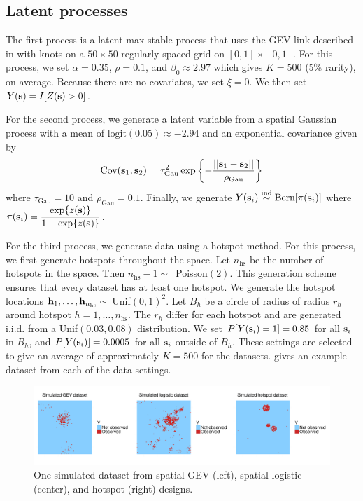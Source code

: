 \subsection{Latent processes} \label{rbs:simsettings}
The first process is a latent max-stable process that uses the GEV link described in  with knots on a $50 \times 50$ regularly spaced grid on $[0, 1] \times [0, 1]$.
For this process, we set $\alpha = 0.35$, $\rho = 0.1$, and $\beta_0 \approx 2.97$ which gives $K = 500$ (5\% rarity), on average.
Because there are no covariates, we set $\xi = 0$.
We then set $Y(\mathbf{s}) = I[Z(\mathbf{s}) > 0]$.

For the second process, we generate a latent variable from a spatial Gaussian process with a mean of $\text{logit}(0.05) \approx -2.94$ and an exponential covariance given by
\begin{align}
  \text{Cov}(\mathbf{s}_1, \mathbf{s}_2) = \tau_\text{Gau}^2 \exp\left\{- \frac{||\mathbf{s}_1 - \mathbf{s}_2||}{\rho_\text{Gau}}\right\}
\end{align}
where $\tau_\text{Gau} = 10$ and $\rho_\text{Gau} = 0.1$.
Finally, we generate $Y(\mathbf{s}_i) \stackrel{\mathrm{ind}}{\sim} \text{Bern}[\pi(\mathbf{s}_i)]$
where $\pi(\mathbf{s}_i) = \displaystyle \frac{ \exp\{z(\mathbf{s})\}}{1 + \exp\{z(\mathbf{s})\} }$.

For the third process, we generate data using a hotspot method.
For this process, we first generate hotspots throughout the space.
Let $n_\text{hs}$ be the number of hotspots in the space.
Then \mbox{$n_\text{hs} - 1 \sim$ Poisson$(2)$}.
This generation scheme ensures that every dataset has at least one hotspot.
We generate the hotspot locations $\mathbf{h}_1, \ldots, \mathbf{h}_{n_\text{hs}} \sim$ Unif$(0, 1)^2$.
Let $B_h$ be a circle of radius of radius $r_h$ around hotspot $h = 1, \ldots, n_\text{hs}$.
The $r_h$ differ for each hotspot and are generated i.i.d. from a Unif$(0.03, 0.08)$ distribution.
We set $P[Y(\mathbf{s}_i) = 1] = 0.85$ for all $\mathbf{s}_i$ in $B_h$, and $P[Y(\mathbf{s}_i)] = 0.0005$ for all $\mathbf{s}_i$ outside of $B_h$.
These settings are selected to give an average of approximately $K = 500$ for the datasets.
 gives an example dataset from each of the data settings.

\begin{figure}  %
  \centering
  \includegraphics[width=\linewidth, trim={0em, 1em, 0em, 1em}]{plots/simulateddata}
  \caption{One simulated dataset from spatial GEV (left), spatial logistic (center), and hotspot (right) designs.}
  \label{rbfig:simulateddata}
\end{figure}

